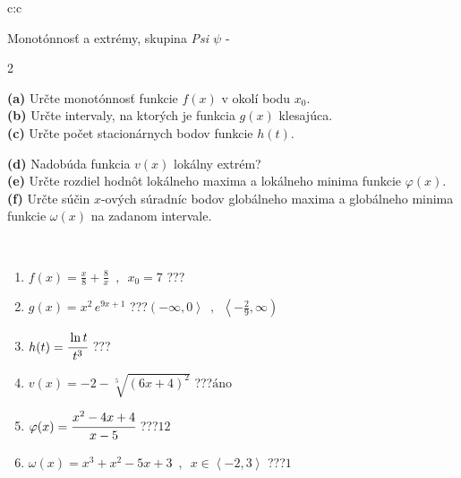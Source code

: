 \documentclass[10pt]{report}
\begin{document}
\newpage
\thispagestyle{empty}
\begin{tabular}{c:c}
\begin{minipage}[c][104.5mm][t]{0.5\linewidth}
\begin{center}
\vspace{7mm}
{\huge Monotónnosť a extrémy, skupina \textit{Psi $\psi$} -}\\[5mm]
\begin{minipage}{0.95\linewidth}
\begin{center}
{\small \begin{multicols}{2} \raggedright
\textbf{(a)} Určte monotónnosť funkcie \(f(x)\) v okolí bodu \(x_0\). \\[1mm]
\textbf{(b)} Určte intervaly, na ktorých je funkcia \(g(x)\) klesajúca. \\[1mm]
\textbf{(c)} Určte počet stacionárnych bodov funkcie \(h(t)\). \par \columnbreak
\textbf{(d)} Nadobúda funkcia \(v(x)\) lokálny extrém? \\[1mm]
\textbf{(e)} Určte rozdiel hodnôt lokálneho maxima a lokálneho minima funkcie \(\varphi(x)\). \\[1mm]
\textbf{(f)} Určte súčin \(x\)-ových súradníc bodov globálneho maxima a globálneho minima funkcie \(\omega(x)\) na zadanom intervale. \\[1mm]
\end{multicols}
}
\end{center}
\end{minipage}
\\[4mm]
\begin{minipage}{0.79\linewidth}
\begin{center}
\begin{varwidth}{\linewidth}
\begin{enumerate}
\normalsize
\item $f(x)=\frac{x}{8}+\frac{8}{x} \enspace , \enspace x_0=7$\quad \dotfill\; ???\;\dotfill \quad {}
\item $g(x)=x^2\, e^{9x+1}$\quad \dotfill\; ???\;\dotfill \quad $\left(-\infty , 0\right\rangle\enspace , \enspace \left\langle-\frac{2}{9} , \infty\right)$
\item $h(t)=\cfrac{\ln t}{t^3}$\quad \dotfill\; ???\;\dotfill {}
\item $v(x)=-2-\sqrt[5]{(6x+4)^2}$\quad \dotfill\; ???\;\dotfill \quad $\text{áno}$
\item $\varphi(x)=\cfrac{x^2-4x+4}{x-5}$\quad \dotfill\; ???\;\dotfill \quad $12$
\item $\omega(x)=x^3+x^2-5x+3 \enspace , \enspace x\in\left\langle-2 , 3\right\rangle$\quad \dotfill\; ???\;\dotfill \quad $1$

\end{enumerate}
\end{varwidth}
\end{center}
\end{minipage}
\end{center}
\end{minipage}
\end{tabular}
\end{document}
